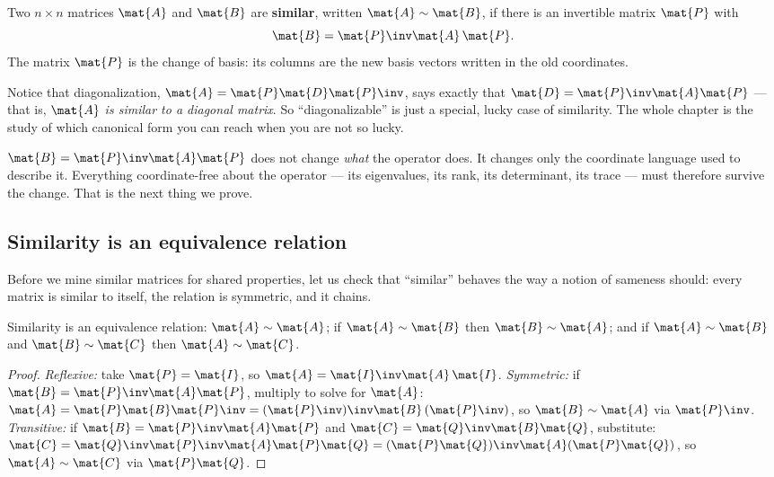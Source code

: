 \begin{definition}
\label{ch28:def-similar}
Two $n\times n$ matrices $\mat{A}$ and $\mat{B}$ are \textbf{similar}, written
$\mat{A}\sim\mat{B}$, if there is an invertible matrix $\mat{P}$ with
\[
\mat{B} = \mat{P}\inv \mat{A}\, \mat{P}.
\]
The matrix $\mat{P}$ is the change of basis: its columns are the new basis vectors
written in the old coordinates.
\end{definition}

Notice that diagonalization, $\mat{A}=\mat{P}\mat{D}\mat{P}\inv$, says exactly that
$\mat{D}=\mat{P}\inv\mat{A}\mat{P}$ --- that is, \emph{$\mat{A}$ is similar to a diagonal
matrix}. So ``diagonalizable'' is just a special, lucky case of similarity. The whole
chapter is the study of which canonical form you can reach when you are not so lucky.

\begin{focusbox}
$\mat{B}=\mat{P}\inv\mat{A}\mat{P}$ does not change \emph{what} the operator does. It
changes only the coordinate language used to describe it. Everything coordinate-free
about the operator --- its eigenvalues, its rank, its determinant, its trace --- must
therefore survive the change. That is the next thing we prove.
\end{focusbox}

\subsection{Similarity is an equivalence relation}

Before we mine similar matrices for shared properties, let us check that ``similar'' behaves
the way a notion of sameness should: every matrix is similar to itself, the relation is
symmetric, and it chains.

\begin{proposition}
\label{ch28:equiv}
Similarity is an equivalence relation: $\mat{A}\sim\mat{A}$; if $\mat{A}\sim\mat{B}$ then
$\mat{B}\sim\mat{A}$; and if $\mat{A}\sim\mat{B}$ and $\mat{B}\sim\mat{C}$ then
$\mat{A}\sim\mat{C}$.
\end{proposition}

\begin{proof}
\emph{Reflexive:} take $\mat{P}=\mat{I}$, so $\mat{A}=\mat{I}\inv\mat{A}\,\mat{I}$.
\emph{Symmetric:} if $\mat{B}=\mat{P}\inv\mat{A}\mat{P}$, multiply to solve for $\mat{A}$:
$\mat{A}=\mat{P}\mat{B}\mat{P}\inv=(\mat{P}\inv)\inv\mat{B}\,(\mat{P}\inv)$, so
$\mat{B}\sim\mat{A}$ via $\mat{P}\inv$. \emph{Transitive:} if
$\mat{B}=\mat{P}\inv\mat{A}\mat{P}$ and $\mat{C}=\mat{Q}\inv\mat{B}\mat{Q}$, substitute:
$\mat{C}=\mat{Q}\inv\mat{P}\inv\mat{A}\mat{P}\mat{Q}=(\mat{P}\mat{Q})\inv\mat{A}(\mat{P}\mat{Q})$,
so $\mat{A}\sim\mat{C}$ via $\mat{P}\mat{Q}$.
\end{proof}

